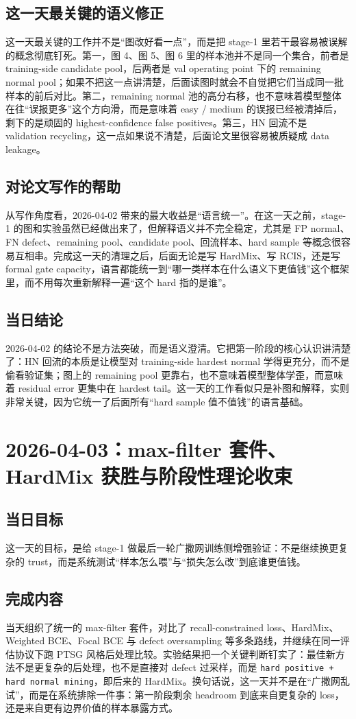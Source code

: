 \documentclass[UTF8,12pt]{ctexart}
\newcommand{\reportdate}[1]{\section{#1}}
\begin{document}
\subsection{这一天最关键的语义修正}
这一天最关键的工作并不是“图改好看一点”，而是把 stage-1 里若干最容易被误解的概念彻底钉死。第一，图 4、图 5、图 6 里的样本池并不是同一个集合，前者是 training-side candidate pool，后两者是 val operating point 下的 remaining normal pool；如果不把这一点讲清楚，后面读图时就会不自觉把它们当成同一批样本的前后对比。第二，remaining normal 池的高分右移，也不意味着模型整体在往“误报更多”这个方向滑，而是意味着 easy / medium 的误报已经被清掉后，剩下的是顽固的 highest-confidence false positives。第三，HN 回流不是 validation recycling，这一点如果说不清楚，后面论文里很容易被质疑成 data leakage。

\subsection{对论文写作的帮助}
从写作角度看，2026-04-02 带来的最大收益是“语言统一”。在这一天之前，stage-1 的图和实验虽然已经做出来了，但解释语义并不完全稳定，尤其是 FP normal、FN defect、remaining pool、candidate pool、回流样本、hard sample 等概念很容易互相串。完成这一天的清理之后，后面无论是写 HardMix、写 RCIS，还是写 formal gate capacity，语言都能统一到“哪一类样本在什么语义下更值钱”这个框架里，而不用每次重新解释一遍“这个 hard 指的是谁”。

\subsection{当日结论}
2026-04-02 的结论不是方法突破，而是语义澄清。它把第一阶段的核心认识讲清楚了：HN 回流的本质是让模型对 training-side hardest normal 学得更充分，而不是偷看验证集；图上的 remaining pool 更靠右，也不意味着模型整体学歪，而意味着 residual error 更集中在 hardest tail。这一天的工作看似只是补图和解释，实则非常关键，因为它统一了后面所有“hard sample 值不值钱”的语言基础。

\reportdate{2026-04-03：max-filter 套件、HardMix 获胜与阶段性理论收束}

\subsection{当日目标}
这一天的目标，是给 stage-1 做最后一轮广撒网训练侧增强验证：不是继续换更复杂的 trust，而是系统测试“样本怎么喂”与“损失怎么改”到底谁更值钱。

\subsection{完成内容}
当天组织了统一的 max-filter 套件，对比了 recall-constrained loss、HardMix、Weighted BCE、Focal BCE 与 defect oversampling 等多条路线，并继续在同一评估协议下跑 PTSG 风格后处理比较。实验结果把一个关键判断钉实了：最佳新方法不是更复杂的后处理，也不是直接对 defect 过采样，而是 \texttt{hard positive + hard normal mining}，即后来的 HardMix。换句话说，这一天并不是在“广撒网乱试”，而是在系统排除一件事：第一阶段剩余 headroom 到底来自更复杂的 loss，还是来自更有边界价值的样本暴露方式。
\end{document}
